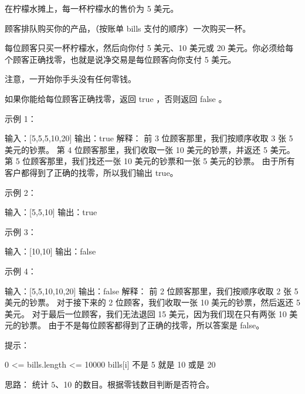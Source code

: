 在柠檬水摊上，每一杯柠檬水的售价为 5 美元。

顾客排队购买你的产品，（按账单 bills 支付的顺序）一次购买一杯。

每位顾客只买一杯柠檬水，然后向你付 5 美元、10 美元或 20 美元。你必须给每个顾客正确找零，也就是说净交易是每位顾客向你支付 5 美元。

注意，一开始你手头没有任何零钱。

如果你能给每位顾客正确找零，返回 true ，否则返回 false 。

示例 1：

输入：[5,5,5,10,20]
输出：true
解释：
前 3 位顾客那里，我们按顺序收取 3 张 5 美元的钞票。
第 4 位顾客那里，我们收取一张 10 美元的钞票，并返还 5 美元。
第 5 位顾客那里，我们找还一张 10 美元的钞票和一张 5 美元的钞票。
由于所有客户都得到了正确的找零，所以我们输出 true。

示例 2：

输入：[5,5,10]
输出：true

示例 3：

输入：[10,10]
输出：false

示例 4：

输入：[5,5,10,10,20]
输出：false
解释：
前 2 位顾客那里，我们按顺序收取 2 张 5 美元的钞票。
对于接下来的 2 位顾客，我们收取一张 10 美元的钞票，然后返还 5 美元。
对于最后一位顾客，我们无法退回 15 美元，因为我们现在只有两张 10 美元的钞票。
由于不是每位顾客都得到了正确的找零，所以答案是 false。

 

提示：

    0 <= bills.length <= 10000
    bills[i] 不是 5 就是 10 或是 20 
































思路：
统计 $5、$10 的数目。根据零钱数目判断是否符合。

























